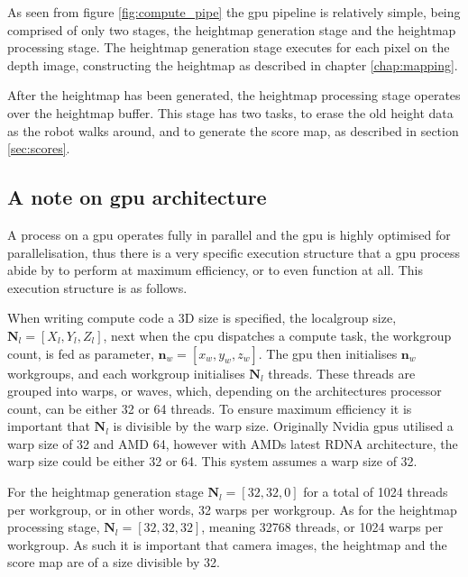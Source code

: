     \noindent
    As seen from figure \ref{fig:compute_pipe} the \ac{gpu} pipeline is relatively simple, being comprised of only two stages, the heightmap generation
    stage and the heightmap processing stage. The heightmap generation stage executes for each pixel on the depth image, constructing the heightmap as 
    described in chapter \ref{chap:mapping}.
    
    After the heightmap has been generated, the heightmap processing stage operates over the heightmap buffer. This stage has two tasks, to erase the
    old height data as the robot walks around, and to generate the score map, as described in section \ref{sec:scores}.
    
    \subsection{A note on \ac{gpu} architecture}
    A process on a \ac{gpu} operates fully in parallel and the \ac{gpu} is highly optimised for parallelisation, thus there is a very specific
    execution structure that a \ac{gpu} process abide by to perform at maximum efficiency, or to even function at all. This execution structure is
    as follows.
    
    When writing compute code a 3D size is specified, the localgroup size, \(\bm{N}_{l} = [X_l,Y_{l},Z_{l}]\), next when the \ac{cpu} dispatches
    a compute task, the workgroup count, is fed as parameter, \(\bm{n}_{w} = [x_{w},y_{w},z_{w}]\). The \ac{gpu} then initialises
    \(\bm{n}_w\) workgroups, and each workgroup initialises \(\bm{N}_l\) threads. These threads are grouped into warps, or waves, which, depending on the architectures processor count,
    can be either 32 or 64 threads. To ensure maximum efficiency it is important that \(\bm{N}_l\) is divisible by the warp size.
    Originally Nvidia \ac{gpu}s utilised a warp size of 32 and AMD 64, however with AMDs latest RDNA architecture, the warp size could be either 32 or 64.
    This system assumes a warp size of 32.
    
    For the heightmap generation stage \(\bm{N}_{l} = [32,32,0]\) for a total of 1024 threads per workgroup, or in other words, 32 warps per workgroup.
    As for the heightmap processing stage, \(\bm{N}_{l} = [32,32,32]\), meaning 32768 threads, or 1024 warps per workgroup.
    As such it is important that camera images, the heightmap and the score map are of a size divisible by 32.

